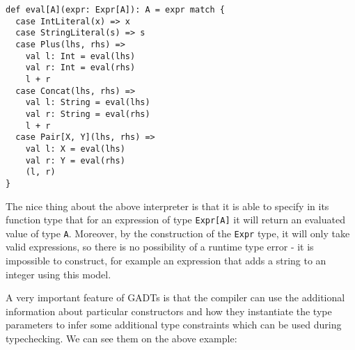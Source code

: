 \begin{verbatim}
def eval[A](expr: Expr[A]): A = expr match {
  case IntLiteral(x) => x
  case StringLiteral(s) => s
  case Plus(lhs, rhs) => 
    val l: Int = eval(lhs)
    val r: Int = eval(rhs)
    l + r
  case Concat(lhs, rhs) =>
    val l: String = eval(lhs)
    val r: String = eval(rhs)
    l + r
  case Pair[X, Y](lhs, rhs) =>
    val l: X = eval(lhs)
    val r: Y = eval(rhs)
    (l, r)
}
\end{verbatim}

The nice thing about the above interpreter is that it is able to specify in its function type that for an expression of type \texttt{Expr[A]} it will return an evaluated value of type \texttt{A}. Moreover, by the construction of the \texttt{Expr} type, it will only take valid expressions, so there is no possibility of a runtime type error - it is impossible to construct, for example an expression that adds a string to an integer using this model.

A very important feature of GADTs is that the compiler can use the additional information about particular constructors and how they instantiate the type parameters to infer some additional type constraints which can be used during typechecking. We can see them on the above example:

